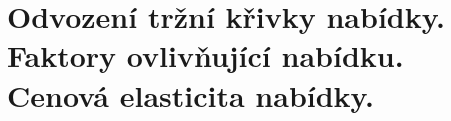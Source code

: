 \clearpage
\section{Odvození tržní křivky nabídky. Faktory ovlivňující nabídku. Cenová elasticita nabídky.}